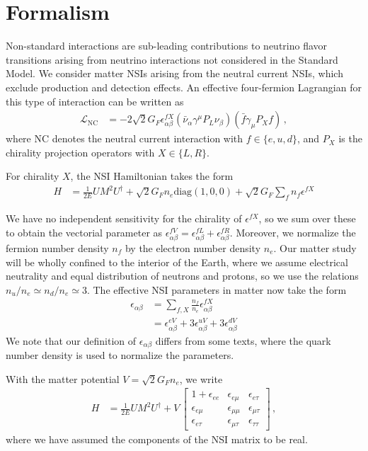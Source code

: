 \documentclass[draft=True]{revtex4-2}
\begin{document}
\section{Formalism}
Non-standard interactions are sub-leading contributions to neutrino flavor transitions arising from neutrino interactions not considered in the Standard Model.
We consider matter NSIs arising from the neutral current NSIs, which exclude production 
and detection effects. An effective four-fermion Lagrangian for this type of interaction can be written as
\begin{align}
   \mathcal{L}_{\mathrm{NC}} &= -2 \sqrt{2} G_{F} \epsilon_{\alpha \beta}^{f X}\left(\bar{\nu}_{\alpha} \gamma^{\mu} P_{L} \nu_{\beta}\right)\left(\bar{f} \gamma_{\mu} P_{X} f\right)\,,
\end{align}
where NC denotes the neutral current interaction with 
$f \in \{e,u,d\}$, and $P_X$ is the chirality projection operators with $X \in \{L,R\}$.  

For chirality $X$, the NSI Hamiltonian takes the form 
\begin{align}
   H &= \frac{1}{2E} UM^2U^\dagger + \sqrt{2}G_F n_e \text{diag}(1,0,0) + \sqrt{2}G_F \sum_f n_f \epsilon^{fX}
\end{align}

We have no independent sensitivity for the chirality of $\epsilon^{fX}$, so we sum over these to obtain the vectorial parameter as $\epsilon^{fV}_{\alpha\beta} = \epsilon^{fL}_{\alpha\beta}+ \epsilon^{fR}_{\alpha\beta}$.
Moreover, we normalize the fermion number density $n_f$ by
the electron number density $n_e$. Our matter study will be wholly confined to the interior of the Earth, where we assume electrical neutrality and equal distribution of neutrons and protons, 
so we use the relations $n_u/n_e \simeq n_d/n_e \simeq 3$.
The effective NSI parameters in matter now take the form
\begin{align} \label{eq:epsilon}
    \epsilon_{\alpha\beta} &= \sum_{f,X} \frac{n_f}{n_e} \epsilon^{fX}_{\alpha\beta} \nonumber \\
                           &= \epsilon_{\alpha\beta}^{eV} + 3\epsilon_{\alpha\beta}^{uV} + 3\epsilon_{\alpha\beta}^{dV}
\end{align}
We note that our definition of $\epsilon_{\alpha\beta}$ differs from some texts, where the quark number density is used to normalize
the parameters\cite{deepcoreNSI}.

With the matter potential $V = \sqrt{2}G_F n_e$, we write
\begin{align} \label{eq:H_NSI}
   H &= \frac{1}{2E} UM^2U^\dagger + V\,
   \begin{bmatrix}
      1 + \epsilon_{ee} & \epsilon_{e\mu} & \epsilon_{e\tau}  \\
      \epsilon_{e\mu} & \epsilon_{\mu\mu} & \epsilon_{\mu\tau}  \\
      \epsilon_{e \tau} & \epsilon_{\mu\tau} & \epsilon_{\tau\tau}
  \end{bmatrix}\,,
\end{align}
where we have assumed the components of the NSI matrix to be real. 
\end{document}
